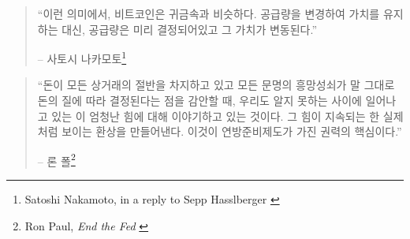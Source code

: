 \begin{quotation}\begin{samepage}
		\enquote{이런 의미에서, 비트코인은 귀금속과 비슷하다. 
		공급량을 변경하여 가치를 유지하는 대신, 공급량은 미리 결정되어있고 그 가치가 변동된다.}
		\begin{flushright} -- 사토시 나카모토\footnote{Satoshi Nakamoto, in a reply to Sepp
				Hasslberger \cite{satoshi-precious-metal}}
\end{flushright}\end{samepage}\end{quotation}


\begin{comment}
	인간은 게으른 동물이기 때문에 당장 잘 작동하는 것에 대해서는 별로 걱정하지 않는다. 
	우리 대부분에게 돈은 잘 작동한다.
	대부분의 사람들은 자동차나 컴퓨터처럼 고장이 난 경우에만 내부 작동 원리를 생각하게 된다.
	초인플레이션으로 인해 일생을 바쳐 모은 저축이 사라지는 것을 본 사람들은 경화(hard money)의 가치를 
	잘 알고 있다. 마치 나치 독일이나 소련 러시아의 잔혹 행위로 인해 친구와 가족의 죽음을 경험한 사람들이 프라이버시의 가치를 아는 것과 같다.
\end{comment}

\begin{comment}
	문제는 돈이 우리의 모든 생활에 영향을 끼친다는 것이다.
	돈은 모든 거래의 절반을 차지하고 있고, 
	돈을 만드는 일을 담당하는 사람에게는 엄청난 힘이 있다.
\end{comment}

\begin{quotation}\begin{samepage}
		\enquote{돈이 모든 상거래의 절반을 차지하고 있고
			모든 문명의 흥망성쇠가 말 그대로 돈의 질에 따라 결정된다는 점을 감안할 때,
			우리도 알지 못하는 사이에 일어나고 있는 이 엄청난 힘에 대해 이야기하고 있는 것이다.
			그 힘이 지속되는 한 실제처럼 보이는 환상을 만들어낸다.
			이것이 연방준비제도가 가진 권력의 핵심이다.}
		\begin{flushright} -- 론 폴\footnote{Ron Paul, \textit{End the Fed} \cite{end-the-fed}}
\end{flushright}\end{samepage}\end{quotation}

